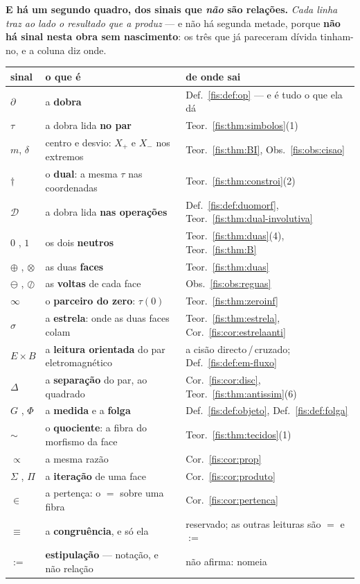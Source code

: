 \documentclass[livro.tex]{subfiles}
\begin{document}
\medskip\noindent\textbf{E há um segundo quadro, dos sinais que \emph{não} são
relações.} \emph{Cada linha traz ao lado o resultado que a produz} --- e não há
segunda metade, porque \textbf{não há sinal nesta obra sem nascimento}: os três
que já pareceram dívida tinham-no, e a coluna diz onde.
\begin{center}\small
\begin{tabular}{@{}lll@{}}
\toprule
sinal & o que é & de onde sai \\
\midrule
$\partial$ & a \textbf{dobra} & Def.~\ref{fis:def:op} --- e é tudo o que ela dá \\
$\tau$ & a dobra lida \textbf{no par} & Teor.~\ref{fis:thm:simbolos}(1) \\
$m$, $\delta$ & centro e desvio: $X_{+}$ e $X_{-}$ nos extremos & Teor.~\ref{fis:thm:BI}, Obs.~\ref{fis:obs:cisao} \\
$\dagger$ & o \textbf{dual}: a mesma $\tau$ nas coordenadas & Teor.~\ref{fis:thm:constroi}(2) \\
$\mathcal{D}$ & a dobra lida \textbf{nas operações} & Def.~\ref{fis:def:duomorf}, Teor.~\ref{fis:thm:dual-involutiva} \\
\midrule
$0$ , $1$ & os dois \textbf{neutros} & Teor.~\ref{fis:thm:duas}(4), Teor.~\ref{fis:thm:B} \\
$\oplus$ , $\otimes$ & as duas \textbf{faces} & Teor.~\ref{fis:thm:duas} \\
$\ominus$ , $\oslash$ & as \textbf{voltas} de cada face & Obs.~\ref{fis:obs:reguas} \\
$\infty$ & o \textbf{parceiro do zero}: $\tau(0)$ & Teor.~\ref{fis:thm:zeroinf} \\
$\sigma$ & a \textbf{estrela}: onde as duas faces colam & Teor.~\ref{fis:thm:estrela}, Cor.~\ref{fis:cor:estrelaanti} \\
$E\times B$ & a \textbf{leitura orientada} do par eletromagnético & a cisão directo\,/\,cruzado; Def.~\ref{fis:def:em-fluxo} \\
\midrule
$\Delta$ & a \textbf{separação} do par, ao quadrado & Cor.~\ref{fis:cor:disc}, Teor.~\ref{fis:thm:antissim}(6) \\
$G$ , $\Phi$ & a \textbf{medida} e a \textbf{folga} & Def.~\ref{fis:def:objeto}, Def.~\ref{fis:def:folga} \\
$\sim$ & o \textbf{quociente}: a fibra do morfismo da face & Teor.~\ref{fis:thm:tecidos}(1) \\
$\propto$ & a mesma razão & Cor.~\ref{fis:cor:prop} \\
$\Sigma$ , $\Pi$ & a \textbf{iteração} de uma face & Cor.~\ref{fis:cor:produto} \\
$\in$ & a pertença: o $=$ sobre uma fibra & Cor.~\ref{fis:cor:pertenca} \\
$\equiv$ & a \textbf{congruência}, e só ela & reservado; as outras leituras são $=$ e $:=$ \\
$:=$ & \textbf{estipulação} --- notação, e não relação & não afirma: nomeia \\
\bottomrule
\end{tabular}
\end{center}
\end{document}
